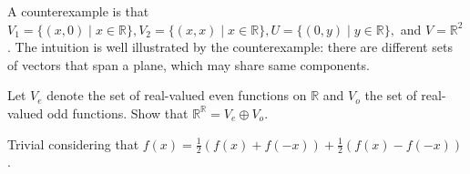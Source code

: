 A counterexample is that $V_1=\{(x,0)\mid x\in \mathbb R\}, V_2=\{(x,x)\mid x\in \mathbb R\}, U=\{(0,y)\mid y\in \mathbb R\},$ and $V=\mathbb R^2$. The intuition is well illustrated by the counterexample: there are different sets of vectors that span a plane, which may share same components.

\begin{exercise}
  Let $V_e$ denote the set of real-valued even functions on $\mathbb R$ and $V_o$ the set of real-valued odd functions. Show that $\mathbb R^{\mathbb R}=V_e\oplus V_o$.
\end{exercise}

Trivial considering that $f(x)=\displaystyle\frac{1}{2}\left(f(x)+f(-x)\right)+\frac{1}{2}\left(f(x)-f(-x)\right)$.
